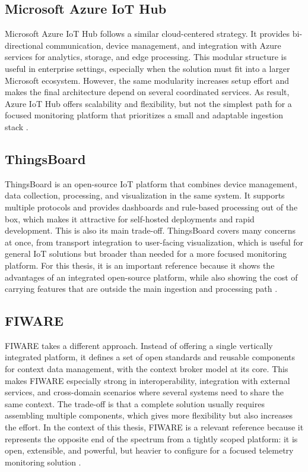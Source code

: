 \subsection{Microsoft Azure IoT Hub}
Microsoft Azure IoT Hub follows a similar cloud-centered strategy. It provides
bi-directional communication, device management, and integration with Azure
services for analytics, storage, and edge processing. This modular structure is
useful in enterprise settings, especially when the solution must fit into a
larger Microsoft ecosystem. However, the same modularity increases setup effort
and makes the final architecture depend on several coordinated services. As
result, Azure IoT Hub offers scalability and flexibility, but not the simplest path
for a focused monitoring platform that prioritizes a small and adaptable
ingestion stack \cite{panagou2025comprehensive, s22062196}.

\subsection{ThingsBoard}
ThingsBoard is an open-source IoT platform that combines device management,
data collection, processing, and visualization in the same system. It supports
multiple protocols and provides dashboards and rule-based processing out of the
box, which makes it attractive for self-hosted deployments and rapid
development. This is also its main trade-off. ThingsBoard covers many
concerns at once, from transport integration to user-facing visualization,
which is useful for general IoT solutions but broader than needed for a more
focused monitoring platform. For this thesis, it is an important reference
because it shows the advantages of an integrated open-source platform, while
also showing the cost of carrying features that are outside the main ingestion
and processing path \cite{app12042172}.

\subsection{FIWARE}
FIWARE takes a different approach. Instead of offering a single vertically
integrated platform, it defines a set of open standards and reusable
components for context data management, with the context broker model at its
core. This makes FIWARE especially strong in interoperability, integration with
external services, and cross-domain scenarios where several systems need to
share the same context. The trade-off is that a complete
solution usually requires assembling multiple components, which gives more
flexibility but also increases the effort. In the context of this
thesis, FIWARE is a relevant reference because it represents the opposite end
of the spectrum from a tightly scoped platform: it is open, extensible, and
powerful, but heavier to configure for a focused telemetry monitoring solution
\cite{app12042172}.

